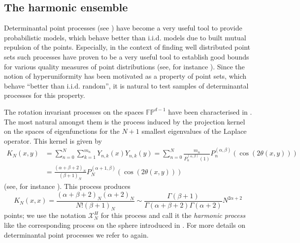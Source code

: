 \subsection{The harmonic ensemble}\label{sec:harmonic-ensemble}
Determinantal point processes (see
\cite{Hough_Krishnapur_Peres+2009:zeros_gaussian}) have become a very useful
tool to provide probabilistic models, which behave better than i.i.d. models
due to built mutual repulsion of the points. Especially, in the context of
finding well distributed point sets such processes have proven to be a very
useful tool to establish good bounds for various quality measures of point
distributions (see, for instance
\cite{Anderson_Dostert_Grabner+2023:riesz_green_energy,
  Beltran_Marzo_Ortega-Cerda2016:determinantal,
  Beltran-Etayo2018:projective_ensemble, Hirao2021:finite_frames_determinantal,
  Beltran_Ferizovic2020:approximation_uniform_SO3,
  Marzo_Ortega-Cerda2018:expected_riesz_energy,
  Hirao2018:qmc_designs_determinantal}). Since the notion of hyperuniformity
has been motivated as a property of point sets, which behave ``better than
i.i.d. random'', it is natural to test samples of determinantal processes for
this property.

The rotation invariant processes on the spaces $\mathbb{FP}^{d-1}$ have been
characterised in \cite{Anderson_Dostert_Grabner+2023:riesz_green_energy}. The
most natural amongst them is the process induced by the projection kernel on
the spaces of eigenfunctions for the $N+1$ smallest eigenvalues of the Laplace
operator. This kernel is given by
\begin{equation}
  \label{eq:harmonic-kernel}
  \begin{split}
    K_N(x,y)&=\sum_{n=0}^N\sum_{k=1}^{m_n}Y_{n,k}(x)Y_{n,k}(y)=
    \sum_{n=0}^N\frac{m_n}{P_n^{(\alpha,\beta)}(1)}
    P_n^{(\alpha,\beta)}(\cos(2\theta(x,y)))\\
    &=
    \frac{(\alpha+\beta+2)_N}{(\beta+1)_N}P_N^{(\alpha+1,\beta)}(\cos(2\theta(x,y)))
  \end{split}
\end{equation}
(see, for instance \cite{Andrews_Askey_Roy1999:special_functions}). This
process produces
\begin{equation*}
  K_N(x,x)=\frac{(\alpha+\beta+2)_N(\alpha+2)_N}{N!(\beta+1)_N}\sim
  \frac{\Gamma(\beta+1)}{\Gamma(\alpha+\beta+2)\Gamma(\alpha+2)}N^{2\alpha+2}
\end{equation*}
points; we use the notation $\mathscr{X}_N^H$ for this process and call it the
\emph{harmonic process} like the corresponding process on the sphere introduced
in \cite{Beltran_Marzo_Ortega-Cerda2016:determinantal}. For more details
on determinantal point processes we refer to
\cite{Hough_Krishnapur_Peres+2009:zeros_gaussian} again.

